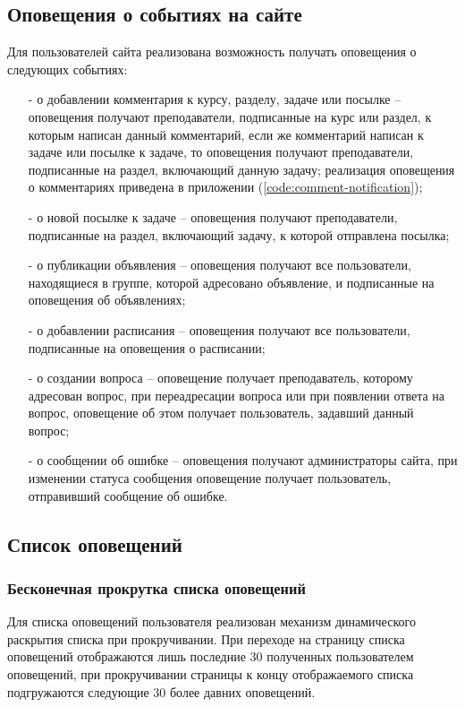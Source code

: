 \documentclass[12pt, a4paper, oneside]{article}
\begin{document}
\subsection{Оповещения о событиях на сайте}
Для пользователей сайта реализована возможность получать оповещения о следующих событиях:
\begin{itemize}
    \item [-] о добавлении комментария к курсу, разделу, задаче или посылке – оповещения получают преподаватели, подписанные на курс или раздел, к которым написан данный комментарий, если же комментарий написан к задаче или посылке к задаче, то оповещения получают преподаватели, подписанные на раздел, включающий данную задачу; реализация оповещения о комментариях приведена в приложении (\ref{code:comment-notification});
    \item [-] о новой посылке к задаче – оповещения получают преподаватели, подписанные на раздел, включающий задачу, к которой отправлена посылка;
    \item [-] о публикации объявления – оповещения получают все пользователи, находящиеся в группе, которой адресовано объявление, и подписанные на оповещения об объявлениях;
    \item [-] о добавлении расписания – оповещения получают все пользователи, подписанные на оповещения о расписании;
    \item [-] о создании вопроса – оповещение получает преподаватель, которому адресован вопрос, при переадресации вопроса или при появлении ответа на вопрос, оповещение об этом получает пользователь, задавший данный вопрос;
    \item [-] о сообщении об ошибке – оповещения получают администраторы сайта, при изменении статуса сообщения оповещение получает пользователь, отправивший сообщение об ошибке.
\end{itemize}
\subsection{Список оповещений}
\subsubsection{Бесконечная прокрутка списка оповещений}
Для списка оповещений пользователя реализован механизм динамического раскрытия списка при прокручивании. При переходе на страницу списка оповещений отображаются лишь последние 30 полученных пользователем оповещений, при прокручивании страницы к концу отображаемого списка подгружаются следующие 30 более давних оповещений.
\end{document}
